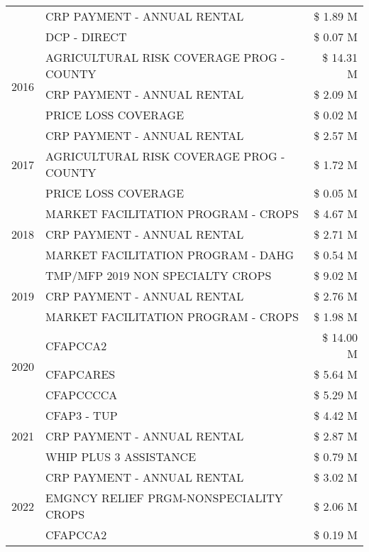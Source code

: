 \begin{tabular}{llr}
 & CRP PAYMENT - ANNUAL RENTAL & \$ 1.89 M \\
 & DCP - DIRECT & \$ 0.07 M \\
\cline{1-3}
\multirow[t]{3}{*}{2016} & AGRICULTURAL RISK COVERAGE PROG - COUNTY & \$ 14.31 M \\
 & CRP PAYMENT - ANNUAL RENTAL & \$ 2.09 M \\
 & PRICE LOSS COVERAGE & \$ 0.02 M \\
\cline{1-3}
\multirow[t]{3}{*}{2017} & CRP PAYMENT - ANNUAL RENTAL & \$ 2.57 M \\
 & AGRICULTURAL RISK COVERAGE PROG - COUNTY & \$ 1.72 M \\
 & PRICE LOSS COVERAGE & \$ 0.05 M \\
\cline{1-3}
\multirow[t]{3}{*}{2018} & MARKET FACILITATION PROGRAM - CROPS & \$ 4.67 M \\
 & CRP PAYMENT - ANNUAL RENTAL & \$ 2.71 M \\
 & MARKET FACILITATION PROGRAM - DAHG & \$ 0.54 M \\
\cline{1-3}
\multirow[t]{3}{*}{2019} & TMP/MFP 2019 NON SPECIALTY CROPS & \$ 9.02 M \\
 & CRP PAYMENT - ANNUAL RENTAL & \$ 2.76 M \\
 & MARKET FACILITATION PROGRAM - CROPS & \$ 1.98 M \\
\cline{1-3}
\multirow[t]{3}{*}{2020} & CFAPCCA2 & \$ 14.00 M \\
 & CFAPCARES & \$ 5.64 M \\
 & CFAPCCCCA & \$ 5.29 M \\
\cline{1-3}
\multirow[t]{3}{*}{2021} & CFAP3 - TUP & \$ 4.42 M \\
 & CRP PAYMENT - ANNUAL RENTAL & \$ 2.87 M \\
 & WHIP PLUS 3 ASSISTANCE & \$ 0.79 M \\
\cline{1-3}
\multirow[t]{3}{*}{2022} & CRP PAYMENT - ANNUAL RENTAL & \$ 3.02 M \\
 & EMGNCY RELIEF PRGM-NONSPECIALITY CROPS & \$ 2.06 M \\
 & CFAPCCA2 & \$ 0.19 M \\
\cline{1-3}
\bottomrule
\end{tabular}
